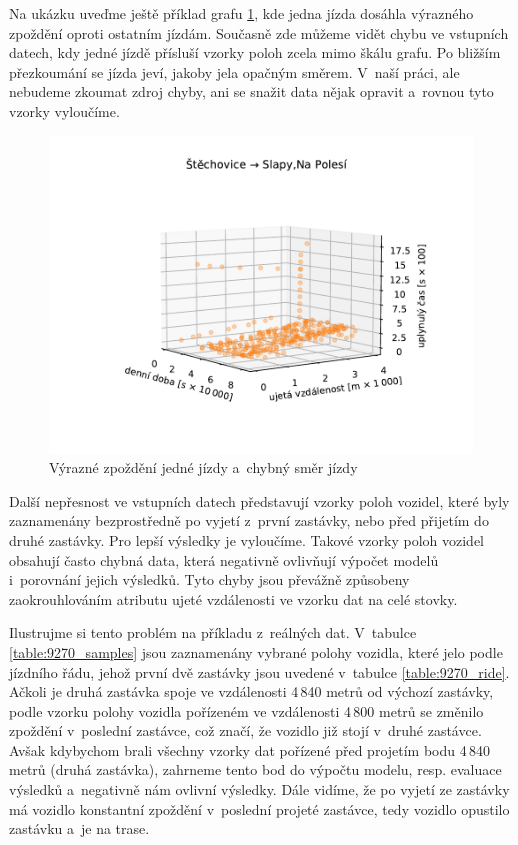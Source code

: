 \bigbreak


Na ukázku uveďme ještě příklad grafu \ref{fig:delayed_trip}, kde jedna jízda dosáhla výrazného zpoždění oproti ostatním jízdám. Současně zde můžeme vidět chybu ve vstupních datech, kdy jedné jízdě přísluší vzorky poloh zcela mimo škálu grafu. Po bližším přezkoumání se jízda jeví, jakoby jela opačným směrem. V~naší práci, ale nebudeme zkoumat zdroj chyby, ani se snažit data nějak opravit a~rovnou tyto vzorky vyloučíme.


\begin{figure}
\centering
  \includegraphics[width=\linewidth]{../img/16_17}
  \caption{Výrazné zpoždění jedné jízdy a~chybný směr jízdy}
  \label{fig:delayed_trip}
\end{figure}

\bigbreak

Další nepřesnost ve vstupních datech představují vzorky poloh vozidel, které byly zaznamenány bezprostředně po vyjetí z~první zastávky, nebo před přijetím do druhé zastávky. Pro lepší výsledky je vyloučíme. Takové vzorky poloh vozidel obsahují často chybná data, která negativně ovlivňují výpočet modelů i~porovnání jejich výsledků. Tyto chyby jsou převážně způsobeny zaokrouhlováním atributu ujeté vzdálenosti ve vzorku dat na celé stovky.

\bigbreak

Ilustrujme si tento problém na příkladu z~reálných dat. V~tabulce \ref{table:9270_samples} jsou zaznamenány vybrané polohy vozidla, které jelo podle jízdního řádu, jehož první dvě zastávky jsou uvedené v~tabulce \ref{table:9270_ride}. Ačkoli je druhá zastávka spoje ve vzdálenosti 4\,840 metrů od výchozí zastávky, podle vzorku polohy vozidla pořízeném ve vzdálenosti 4\,800 metrů se změnilo zpoždění v~poslední zastávce, což značí, že vozidlo již stojí v~druhé zastávce. Avšak kdybychom brali všechny vzorky dat pořízené před projetím bodu 4\,840 metrů (druhá zastávka), zahrneme tento bod do výpočtu modelu, resp. evaluace výsledků a~negativně nám ovlivní výsledky. Dále vidíme, že po vyjetí ze zastávky má vozidlo konstantní zpoždění v~poslední projeté zastávce, tedy vozidlo opustilo zastávku a~je na trase.

